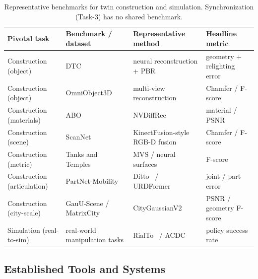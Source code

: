 \begin{table}[!th]
\centering
\fontsize{8}{10}\selectfont
\setlength{\tabcolsep}{1.0mm}
\caption{Representative benchmarks for twin construction and simulation. Synchronization (Task-3) has no shared benchmark.}
\label{tab:p4_s11_1_benchmarks}
\begin{tabular}{L{0.20\textwidth} L{0.22\textwidth} L{0.30\textwidth} L{0.20\textwidth}}
\toprule
\textbf{Pivotal task} & \textbf{Benchmark / dataset} & \textbf{Representative method} & \textbf{Headline metric} \\
\midrule
Construction (object) & DTC~\cite{dong2025dtc} & neural reconstruction + PBR & geometry + relighting error \\
Construction (object) & OmniObject3D~\cite{wu2023omniobject3d} & multi-view reconstruction & Chamfer / F-score \\
Construction (materials) & ABO~\cite{collins2022abo} & NVDiffRec~\cite{munkberg2022extracting} & material / PSNR \\
Construction (scene) & ScanNet~\cite{dai2017scannet} & KinectFusion-style RGB-D fusion~\cite{newcombe2011kinectfusion} & Chamfer / F-score \\
Construction (metric) & Tanks and Temples~\cite{knapitsch2017tanks} & MVS / neural surfaces & F-score \\
Construction (articulation) & PartNet-Mobility~\cite{xiang2020sapien} & Ditto~\cite{jiang2022ditto} / URDFormer~\cite{chen2024urdformer} & joint / part error \\
Construction (city-scale) & GauU-Scene / MatrixCity & CityGaussianV2~\cite{liu2025citygaussian} & PSNR / geometry F-score \\
Simulation (real-to-sim) & real-world manipulation tasks & RialTo~\cite{torne2024reconciling} / ACDC~\cite{dai2024automated} & policy success rate \\
\bottomrule
\end{tabular}
\end{table}

\subsection{Established Tools and Systems}
\label{subsec:p4-sec11-1-established-tools-and-systems}

